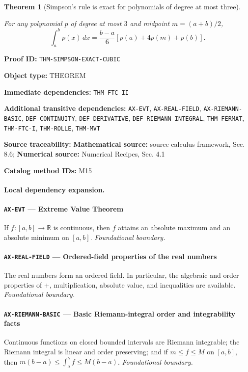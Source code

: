 \documentclass[10pt]{article}
\newcommand{\pidraw}[1]{\begingroup\urlstyle{tt}\nolinkurl{#1}\endgroup}
\newtheorem{theorem}{Theorem}[section]
\theoremstyle{definition}
\theoremstyle{remark}
\newcommand{\meta}[2]{\noindent\textbf{#1:} #2\par}
\begin{document}
\begin{theorem}[Simpson's rule is exact for polynomials of degree at most three]\label{prf:THM-SIMPSON-EXACT-CUBIC}

For any polynomial $p$ of degree at most $3$ and midpoint $m=(a+b)/2$,
\[
\int_a^b p(x)\,dx
=
\frac{b-a}{6}\left[p(a)+4p(m)+p(b)\right].
\]

\end{theorem}

\meta{Proof ID}{\pidraw{THM-SIMPSON-EXACT-CUBIC}}
\meta{Object type}{THEOREM}
\meta{Immediate dependencies}{\pidraw{THM-FTC-II}}
\meta{Additional transitive dependencies}{\pidraw{AX-EVT}, \pidraw{AX-REAL-FIELD}, \pidraw{AX-RIEMANN-BASIC}, \pidraw{DEF-CONTINUITY}, \pidraw{DEF-DERIVATIVE}, \pidraw{DEF-RIEMANN-INTEGRAL}, \pidraw{THM-FERMAT}, \pidraw{THM-FTC-I}, \pidraw{THM-ROLLE}, \pidraw{THM-MVT}}
\meta{Source traceability}{\textbf{Mathematical source:} source calculus framework, Sec. 8.6; \textbf{Numerical source:} Numerical Recipes, Sec. 4.1}
\meta{Catalog method IDs}{M15}

\paragraph{Local dependency expansion.}

\paragraph{\pidraw{AX-EVT} --- Extreme Value Theorem}
If $f:[a,b]\to\mathbb{R}$ is continuous, then $f$ attains an absolute maximum and an absolute minimum on $[a,b]$.
\textit{Foundational boundary.}

\paragraph{\pidraw{AX-REAL-FIELD} --- Ordered-field properties of the real numbers}
The real numbers form an ordered field. In particular, the algebraic and order properties of $+$, multiplication, absolute value, and inequalities are available.
\textit{Foundational boundary.}

\paragraph{\pidraw{AX-RIEMANN-BASIC} --- Basic Riemann-integral order and integrability facts}
Continuous functions on closed bounded intervals are Riemann integrable; the Riemann integral is linear and order preserving; and if $m\le f\le M$ on $[a,b]$, then $m(b-a)\le\int_a^b f\le M(b-a)$.
\textit{Foundational boundary.}
\end{document}
